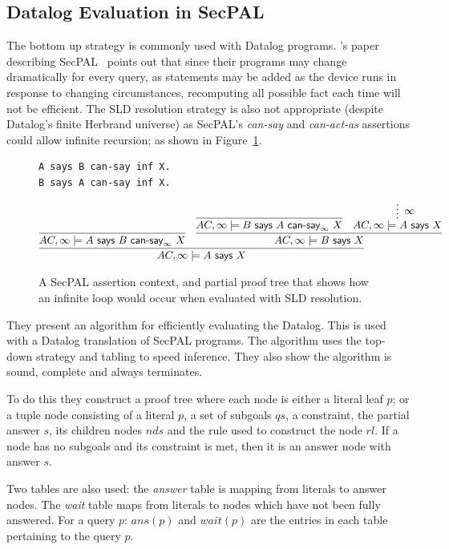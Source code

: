 \documentclass[a4paper]{article}
\begin{document}
\subsection{Datalog Evaluation in SecPAL}

The bottom up strategy is commonly used with Datalog programs.
\citeauthor*{Becker:2009vt}'s paper describing SecPAL~\cite{Becker:2006vh}
points out that since their programs may change dramatically for every query, as
statements may be added as the device runs in response to changing
circumstances, recomputing all possible fact each time  will not be efficient.
The \ac{SLD} resolution strategy is also not appropriate (despite Datalog's
finite Herbrand universe) as SecPAL's \emph{can-say} and \emph{can-act-as}
assertions could allow infinite recursion; as shown in Figure~\ref{secpal:inf}.

\begin{figure}\centering
  \begin{lstlisting}[language=SecPAL]
A says B can-say inf X.
B says A can-say inf X.
  \end{lstlisting}
  \begin{align*}
    \infer{ AC,\infty \models A\textsf{~says~}X }{%
    \infer{AC,\infty \models A \textsf{~says~} B \textsf{~can-say}_\infty~X}{} &
    \infer{AC,\infty \models B \textsf{~says~} X}{%
      \infer{AC,\infty \models B \textsf{~says~} A \textsf{~can-say}_\infty~X}{} &
    \infer*[\infty]{AC,\infty \models A \textsf{~says~} X}{}
      }
    }
  \end{align*}
  \caption{A SecPAL assertion context, and partial proof tree that shows how an
    infinite loop would occur when evaluated with \ac{SLD} resolution.}
  \label{secpal:inf}
\end{figure}

They present an algorithm for efficiently evaluating the Datalog. This is used
with a Datalog translation of
SecPAL programs.  The algorithm uses the top-down strategy and tabling to speed
inference. They also show the algorithm is sound, complete and always
terminates. 

To do this they construct a proof tree where each node is either a literal leaf
$p$; or a tuple node consisting of a literal $p$, a set of subgoals $qs$, a
constraint, the partial answer $s$, its children nodes $nds$ and the rule used
to construct the node $rl$.  If a node has no subgoals and its constraint
is met, then it is an answer node with answer $s$.

Two tables are also used: the \emph{answer} table is mapping from literals to
answer nodes.  The \emph{wait} table maps from literals to nodes which
have not been fully answered.  For a query $p$: $ans(p)$ and $wait(p)$ are the
entries in each table pertaining to the query $p$.
\end{document}
